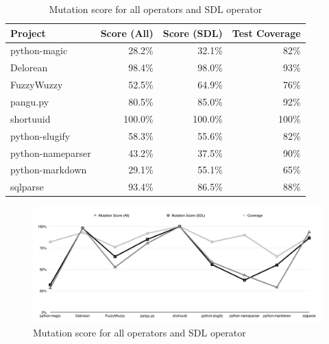 \documentclass[12pt]{article}
\begin{document}
\begin{table}[H]
\begin{center}
\caption{Mutation score for all operators and SDL operator}
\label{table:score}
\begin{tabular}{|l|r|r|r|}
\hline
{\bf Project} & {\bf Score (All)} & {\bf Score (SDL)} & {\bf Test Coverage} \\
\hline
python-magic      & 28.2\%  &  32.1\% &  82\% \\
Delorean          & 98.4\%  &  98.0\% &  93\% \\
FuzzyWuzzy        & 52.5\%  &  64.9\% &  76\% \\
pangu.py          & 80.5\%  &  85.0\% &  92\% \\
shortuuid         & 100.0\% & 100.0\% & 100\% \\
python-slugify    & 58.3\%  &  55.6\% &  82\% \\
python-nameparser & 43.2\%  &  37.5\% &  90\% \\
python-markdown   & 29.1\%  &  55.1\% &  65\% \\
sqlparse          & 93.4\%  &  86.5\% &  88\% \\
\hline
\end{tabular}
\end{center}
\end{table}

\begin{figure}[H]
\begin{center}
\caption{Mutation score for all operators and SDL operator}
\label{fig:score}
\includegraphics[width=15cm]{score}
\end{center}
\end{figure}
\end{document}
